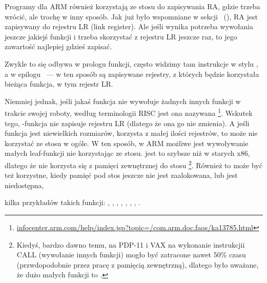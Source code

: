 Programy dla ARM również korzystają ze stosu do zapisywania \ac{RA}, gdzie trzeba wrócić, ale trochę w inny sposób.
Jak już było wspomniane w sekcji \q{\HelloWorldSectionName}~(),
\ac{RA} jest zapisywany do rejestru \ac{LR} (\gls{link register}).
Ale jeśli wynika potrzeba wywołania jeszcze jakiejś funkcji i trzeba skorzystać z rejestru \ac{LR} jeszcze
raz, to jego zawartość najlepiej gdzieś zapisać.

Zwykle to się odbywa w prologu funkcji, często widzimy tam instrukcje w stylu , a w epilogu
~--- w ten sposób są zapisywane rejestry, z których będzie korzystała bieżąca funkcja, w tym rejestr \ac{LR}.

Niemniej jednak, jeśli jakaś funkcja nie wywołuje żadnych innych funkcji w trakcie swojej roboty, według terminologii \ac{RISC} jest ona nazywana
\footnote{\href{http://go.yurichev.com/17064}{infocenter.arm.com/help/index.jsp?topic=/com.arm.doc.faqs/ka13785.html}}. 
Wskutek tego, -funkcja nie zapisuje rejestru \ac{LR} (dlatego że ona go nie zmienia).
A jeśli funkcja jest niewielkich rozmiarów, korzysta z małej ilości rejestrów, to może nie korzystać ze stosu w ogóle.
W ten sposób, w ARM możliwe jest wywoływanie małych leaf-funkcji nie korzystając ze stosu.
jest to szybsze niż w starych x86, dlatego że nie korzysta się z pamięci zewnętrznej do stosu
\footnote{Kiedyś, bardzo dawno temu, na PDP-11 i VAX na wykonanie instrukcjii CALL (wywołanie innych funkcji) mogło być zatracone
nawet 50\% czasu (przwdopodobnie przez pracę z pamięcią zewnętrzną),
dlatego było uważane, że dużo małych funkcji to 
.}.
Również to może być też korzystne, kiedy pamięć pod stos jeszcze nie jest zaalokowana, lub jest niedostępna,

kilka przykładów takich funkcji:
, , 
, , ,
, , .


